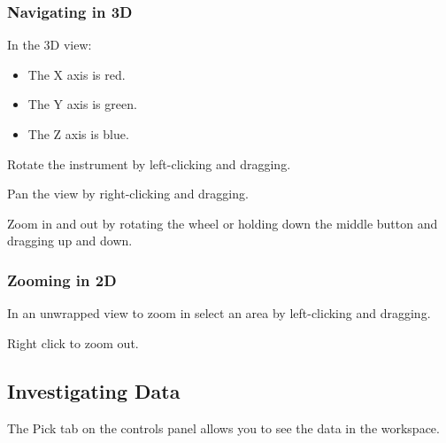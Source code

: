 \documentclass[letterpaper,10pt,english,openany]{sphinxmanual}
\let\sphinxpxdimen\pdfpxdimen\else\newdimen\sphinxpxdimen
\begin{document}
\begin{figure}[H]
\centering

\noindent\sphinxincludegraphics[width=150\sphinxpxdimen]{{DisplaySettings}.png}
\end{figure}


\subsubsection{Navigating in 3D}
\label{\detokenize{mantid_basic_course/connecting_data_to_instruments/02_displaying_and_navigating:navigating-in-3d}}
In the 3D view:
\begin{itemize}
\item {} 
The X axis is red.

\item {} 
The Y axis is green.

\item {} 
The Z axis is blue.

\end{itemize}

Rotate the instrument by left-clicking and dragging.

Pan the view by right-clicking and dragging.

Zoom in and out by rotating the wheel or holding down the middle button
and dragging up and down.


\subsubsection{Zooming in 2D}
\label{\detokenize{mantid_basic_course/connecting_data_to_instruments/02_displaying_and_navigating:zooming-in-2d}}
In an unwrapped view to zoom in select an area by left-clicking and
dragging.

Right click to zoom out.




\subsection{Investigating Data}
\label{\detokenize{mantid_basic_course/connecting_data_to_instruments/03_investigating_data:investigating-data}}\label{\detokenize{mantid_basic_course/connecting_data_to_instruments/03_investigating_data:id1}}\label{\detokenize{mantid_basic_course/connecting_data_to_instruments/03_investigating_data::doc}}
The Pick tab on the controls panel allows you to see the data in the
workspace.
\end{document}
